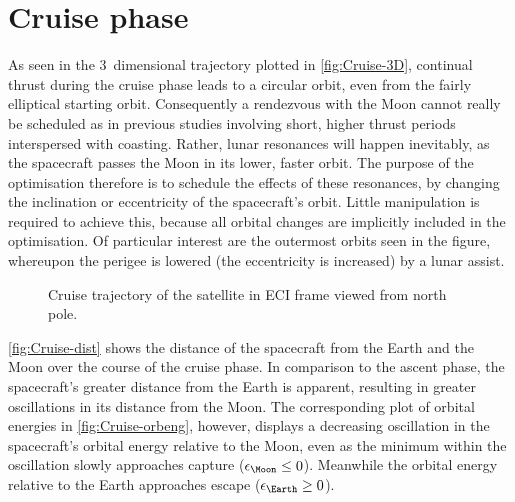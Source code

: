 
\clearpage


\section{Cruise phase} \label{sec:Cruise}

As seen in the 3~dimensional trajectory plotted in \autoref{fig:Cruise-3D}, continual thrust during the cruise phase leads to a circular orbit, even from the fairly elliptical starting orbit. Consequently a rendezvous with the Moon cannot really be scheduled as in previous studies involving short, higher thrust periods interspersed with coasting. Rather, lunar resonances will happen inevitably, as the spacecraft passes the Moon in its lower, faster orbit. The purpose of the optimisation therefore is to schedule the effects of these resonances, by changing the inclination or eccentricity of the spacecraft's orbit. Little manipulation is required to achieve this, because all orbital changes are implicitly included in the optimisation. Of particular interest are the outermost orbits seen in the figure, whereupon the perigee is lowered (the eccentricity is increased) by a lunar assist.

\begin{figure}[h]
\centering
\def\svgwidth{\figurewidth}

\caption{Cruise trajectory of the satellite in ECI frame viewed from north pole.} \label{fig:Cruise-3D}
\end{figure}

\autoref{fig:Cruise-dist} shows the distance of the spacecraft from the Earth and the Moon over the course of the cruise phase. In comparison to the ascent phase, the spacecraft's greater distance from the Earth is apparent, resulting in greater oscillations in its distance from the Moon. The corresponding plot of orbital energies in \autoref{fig:Cruise-orbeng}, however, displays a decreasing oscillation in the spacecraft's orbital energy relative to the Moon, even as the minimum within the oscillation slowly approaches capture ($\epsilon_\Moon\le0$). Meanwhile the orbital energy relative to the Earth approaches escape ($\epsilon_\Earth\ge0$). 

